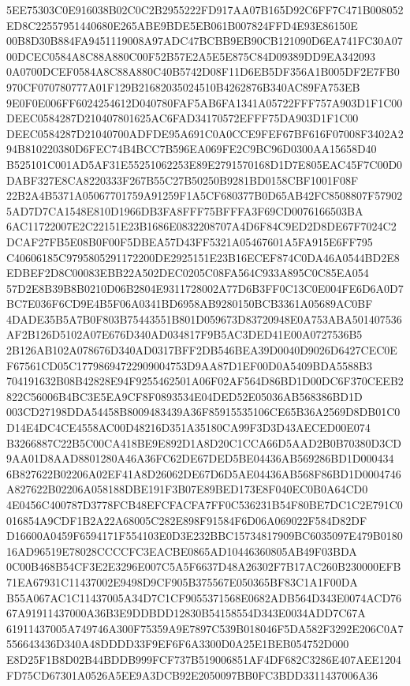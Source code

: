 \documentclass[UTF8,fontset=fandol,zihao=-4,a4paper]{ctexart}
\begin{document}
{{5EE75303C0E916038B02C0C2B2955222FD917AA07B165D92C6FF7C471B008052ED8C22557951440680E265ABE9BDE5EB061B007824FFD4E93E86150E
00B8D30B884FA9451119008A97ADC47BCBB9EB90CB121090D6EA741FC30A0700DCEC0584A8C88A880C00F52B57E2A5E5E875C84D09389DD9EA342093
0A0700DCEF0584A8C88A880C40B5742D08F11D6EB5DF356A1B005DF2E7FB0970CF070780777A01F129B21682035024510B4262876B340AC89FA753EB
9E0F0E006FF6024254612D040780FAF5AB6FA1341A05722FFF757A903D1F1C00DEEC0584287D210407801625AC6FAD34170572EFFF75DA903D1F1C00
DEEC0584287D21040700ADFDE95A691C0A0CCE9FEF67BF616F07008F3402A294B810220380D6FEC74B4BCC7B596EA069FE2C9BC96D0300AA15658D40
B525101C001AD5AF31E55251062253E89E2791570168D1D7E805EAC45F7C00D0DABF327E8CA8220333F267B55C27B50250B9281BD0158CBF1001F08F
22B2A4B5371A05067701759A91259F1A5CF680377B0D65AB42FC8508807F579025AD7D7CA1548E810D1966DB3FA8FFF75BFFFA3F69CD0076166503BA
6AC11722007E2C22151E23B1686E0832208707A4D6F84C9ED2D8DE67F7024C2DCAF27FB5E08B0F00F5DBEA57D43FF5321A05467601A5FA915E6FF795
C40606185C9795805291172200DE2925151E23B16ECEF874C0DA46A0544BD2E8EDBEF2D8C00083EBB22A502DEC0205C08FA564C933A895C0C85EA054
57D2E8B39B8B0210D06B2804E9311728002A77D6B3FF0C13C0E004FE6D6A0D7BC7E036F6CD9E4B5F06A0341BD6958AB9280150BCB3361A05689AC0BF
4DADE35B5A7B0F803B75443551B801D059673D83720948E0A753ABA501407536AF2B126D5102A07E676D340AD034817F9B5AC3DED41E00A0727536B5
2B126AB102A078676D340AD0317BFF2DB546BEA39D0040D9026D6427CEC0EF67561CD05C17798694722909004753D9AA87D1EF00D0A5409BDA5588B3
704191632B08B42828E94F9255462501A06F02AF564D86BD1D00DC6F370CEEB2822C56006B4BC3E5EA9CF8F0893534E04DED52E05036AB568386BD1D
003CD27198DDA54458B8009483439A36F85915535106CE65B36A2569D8DB01C0D14E4DC4CE4558AC00D48216D351A35180CA99F3D3D43AECED00E074
B3266887C22B5C00CA418BE9E892D1A8D20C1CCA66D5AAD2B0B70380D3CD9AA01D8AAD8801280A46A36FC62DE67DED5BE04436AB569286BD1D000434
6B827622B02206A02EF41A8D26062DE67D6D5AE04436AB568F86BD1D0004746A827622B02206A058188DBE191F3B07E89BED173E8F040EC0B0A64CD0
4E0456C400787D3778FCB48EFCFACFA7FF0C536231B54F80BE7DC1C2E791C0016854A9CDF1B2A22A68005C282E898F91584F6D06A069022F584D82DF
D16600A0459F6594171F554103E0D3E232BBC15734817909BC6035097E479B018016AD96519E78028CCCCFC3EACBE0865AD10446360805AB49F03BDA
0C00B468B54CF3E2E3296E007C5A5F6637D48A26302F7B17AC260B230000EFB71EA67931C11437002E9498D9CF905B375567E050365BF83C1A1F00DA
B55A067AC1C11437005A34D7C1CF9055371568E0682ADB564D343E0074ACD7667A91911437000A36B3E9DDBDD12830B54158554D343E0034ADD7C67A
61911437005A749746A300F75359A9E7897C539B018046F5DA582F3292E206C0A7556643436D340A48DDDD33F9EF6F6A3300D0A25E1BEB054752D000
E8D25F1B8D02B44BDDB999FCF737B519006851AF4DF682C3286E407AEE1204FD75CD67301A0526A5EE9A3DCB92E2050097BB0FC3BDD3311437006A36
}}
\end{document}
